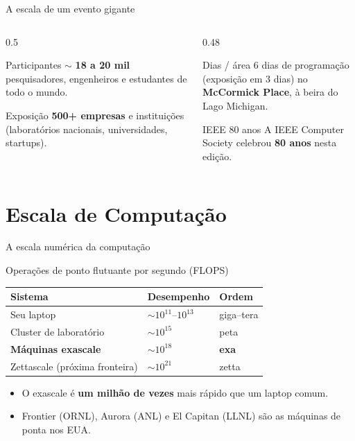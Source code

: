 \documentclass[aspectratio=169, 10pt]{beamer}
\begin{document}
\begin{frame}{A escala de um evento gigante}
  \begin{columns}
    \begin{column}{0.5\textwidth}
      \begin{block}{Participantes}
        $\sim$ \textbf{18 a 20 mil} pesquisadores, engenheiros e estudantes de todo o mundo.
      \end{block}
      \begin{block}{Exposição}
        \textbf{500+ empresas} e instituições \\ (laboratórios nacionais, universidades, startups).
      \end{block}
    \end{column}
    \begin{column}{0.48\textwidth}
      \begin{block}{Dias / área}
        6 dias de programação \\ (exposição em 3 dias) no \textbf{McCormick Place}, à beira do Lago Michigan.
      \end{block}
      \begin{alertblock}{IEEE 80 anos}
        A IEEE Computer Society celebrou \textbf{80 anos} nesta edição.
      \end{alertblock}
    \end{column}
  \end{columns}
\end{frame}

\section{Escala de Computação}

\begin{frame}{A escala numérica da computação}
  \begin{block}{Operações de ponto flutuante por segundo (FLOPS)}
    \centering
    \begin{tabular}{l l l}
      \toprule
      \textbf{Sistema} & \textbf{Desempenho} & \textbf{Ordem} \\
      \midrule
      Seu laptop & $\sim 10^{11}$--$10^{13}$ & giga--tera \\
      Cluster de laboratório & $\sim 10^{15}$ & peta \\
      \textbf{Máquinas exascale} & $\sim 10^{18}$ & \textbf{exa} \\
      Zettascale (próxima fronteira) & $\sim 10^{21}$ & zetta \\
      \bottomrule
    \end{tabular}
  \end{block}
  \begin{itemize}
    \item O exascale é \textbf{um milhão de vezes} mais rápido que um laptop comum.
    \item Frontier (ORNL), Aurora (ANL) e El Capitan (LLNL) são as máquinas de ponta nos EUA.
  \end{itemize}
\end{frame}
\end{document}
